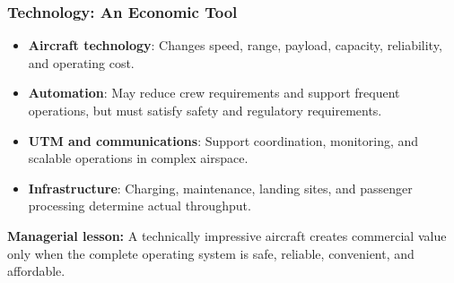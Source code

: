 \documentclass{beamer}
\begin{document}
\begin{frame}[t]
  \frametitle{Technology: An Economic Tool}
  \begin{itemize}
    \item \textbf{Aircraft technology}: Changes speed, range, payload, capacity, reliability, and operating cost.
    \item \textbf{Automation}: May reduce crew requirements and support frequent operations, but must satisfy safety and regulatory requirements.
    \item \textbf{UTM and communications}: Support coordination, monitoring, and scalable operations in complex airspace.
    \item \textbf{Infrastructure}: Charging, maintenance, landing sites, and passenger processing determine actual throughput.
  \end{itemize}
  \textbf{Managerial lesson:} A technically impressive aircraft creates commercial value only when the complete operating system is safe, reliable, convenient, and affordable.
\end{frame}
\end{document}
